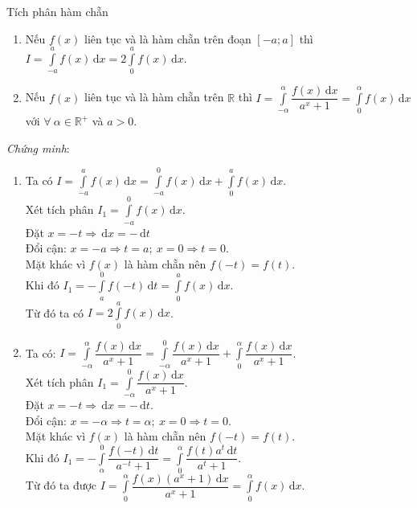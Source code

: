 \begin{dang}{Tích phân hàm chẵn}
\begin{enumerate}
\item Nếu $f(x)$ liên tục và là hàm chẵn trên đoạn $\left[-a;a\right]$ thì $I=\displaystyle\int\limits_{-a}^{a}f(x)\mathrm{\,d}x=2\displaystyle\int\limits_{0}^{a}f(x)\mathrm{\,d}x$.
\item Nếu $f(x)$ liên tục và là hàm chẵn trên $\mathbb{R}$ thì $I=\displaystyle\int\limits_{-\alpha}^{\alpha}\dfrac{f(x)\mathrm{\,d}x}{a^x+1} =\displaystyle\int\limits_{0}^{\alpha}f(x)\mathrm{\,d}x$ với $\forall\ \alpha \in\mathbb{R}^+$ và $a>0$.
\end{enumerate}
\end{dang}
\noindent
\emph{Chứng minh}:
\begin{enumerate}
\item Ta có $I=\displaystyle\int\limits_{-a}^{a}f(x)\mathrm{\,d}x=\displaystyle\int\limits_{-a}^{0}f(x)\mathrm{\,d}x+\displaystyle\int\limits_{0}^{a}f(x)\mathrm{\,d}x$.\\
		Xét tích phân $I_1=\displaystyle\int\limits_{-a}^{0}f(x)\mathrm{\,d}x$.\\
		Đặt $x=-t\Rightarrow \mathrm{\,d}x=-\mathrm{\,d}t$\\
		Đổi cận: $x=-a\Rightarrow t=a;\ x=0\Rightarrow t=0$.\\
		Mặt khác vì $f(x)$ là hàm chẵn nên $f(-t)=f(t)$.\\
		Khi đó $I_1=-\displaystyle\int\limits_{a}^{0}f(-t)\mathrm{\,d}t=\displaystyle\int\limits_{0}^{a}f(x)\mathrm{\,d}x$.\\
		Từ đó ta có $I=2\displaystyle\int\limits_{0}^{a}f(x)\mathrm{\,d}x$.
\item Ta có:  $I=\displaystyle\int\limits_{-\alpha}^{\alpha}\dfrac{f(x)\mathrm{\,d}x}{a^x+1}=\displaystyle\int\limits_{-\alpha}^{0}\dfrac{f(x)\mathrm{\,d}x}{a^x+1}+\displaystyle\int\limits_{0}^{\alpha}\dfrac{f(x)\mathrm{\,d}x}{a^x+1}$.\\
		Xét tích phân $I_1=\displaystyle\int\limits_{-\alpha}^{0}\dfrac{f(x)\mathrm{\,d}x}{a^x+1}$.\\
		Đặt $x=-t\Rightarrow \mathrm{\,d}x=-\mathrm{\,d}t$.\\
		Đổi cận: $x=-\alpha\Rightarrow t=\alpha;\ x=0\Rightarrow t=0$.\\
		Mặt khác vì $f(x)$ là hàm chẵn nên $f(-t)=f(t)$.\\
		Khi đó $I_1=-\displaystyle\int\limits_{\alpha}^{0}\dfrac{f(-t)\mathrm{\,d}t}{a^{-t}+1}=\displaystyle\int\limits_{0}^{\alpha}\dfrac{f(t)a^t\mathrm{\,d}t}{a^t+1}$.\\
		Từ đó ta được $I=\displaystyle\int\limits_{0}^{\alpha}\dfrac{f(x)(a^x+1)\mathrm{\,d}x}{a^x+1}=\displaystyle\int\limits_{0}^{\alpha}f(x)\mathrm{\,d}x$.
\end{enumerate}
